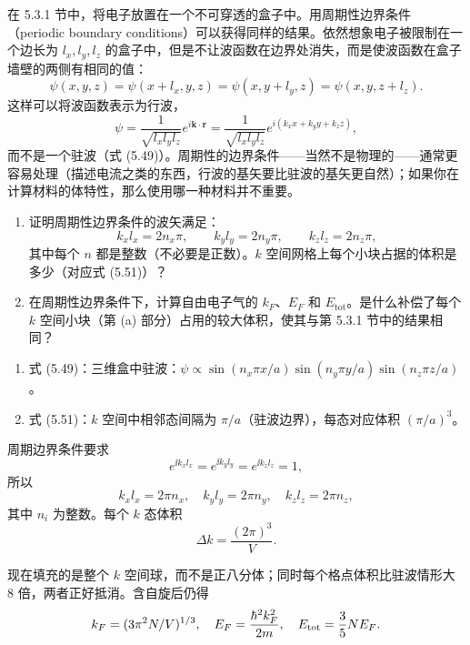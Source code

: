 \begin{question}
在 5.3.1 节中，将电子放置在一个不可穿透的盒子中。用周期性边界条件（periodic boundary conditions）可以获得同样的结果。依然想象电子被限制在一个边长为 $l_x,l_y,l_z$ 的盒子中，但是不让波函数在边界处消失，而是使波函数在盒子墙壁的两侧有相同的值：
\[
\psi(x,y,z)=\psi(x+l_x,y,z)=\psi(x,y+l_y,z)=\psi(x,y,z+l_z).
\]
这样可以将波函数表示为行波，
\[
\psi=\frac{1}{\sqrt{l_xl_yl_z}}e^{i\mathbf k\cdot\mathbf r}=\frac{1}{\sqrt{l_xl_yl_z}}e^{i(k_xx+k_yy+k_zz)},
\]
而不是一个驻波（式 (5.49)）。周期性的边界条件——当然不是物理的——通常更容易处理（描述电流之类的东西，行波的基矢要比驻波的基矢更自然）；如果你在计算材料的体特性，那么使用哪一种材料并不重要。
\begin{enumerate}
\item 证明周期性边界条件的波矢满足：
\[
k_xl_x=2n_x\pi,\qquad k_yl_y=2n_y\pi,\qquad k_zl_z=2n_z\pi,
\]
其中每个 $n$ 都是整数（不必要是正数）。$k$ 空间网格上每个小块占据的体积是多少（对应式 (5.51)）？
\item 在周期性边界条件下，计算自由电子气的 $k_F$、$E_F$ 和 $E_{\mathrm{tot}}$。是什么补偿了每个 $k$ 空间小块（第 (a) 部分）占用的较大体积，使其与第 5.3.1 节中的结果相同？
\end{enumerate}

\par\smallskip
{}
\begin{enumerate}[leftmargin=2.2em,itemsep=0.12em,topsep=0.12em,parsep=0pt]
\item 式 (5.49)：三维盒中驻波：$\psi\propto\sin(n_x\pi x/a)\sin(n_y\pi y/a)\sin(n_z\pi z/a)$。
\item 式 (5.51)：$k$ 空间中相邻态间隔为 $\pi/a$（驻波边界），每态对应体积 $(\pi/a)^3$。
\end{enumerate}

\end{question}
\begin{solution}

周期边界条件要求
\[
e^{\ii k_xl_x}=e^{\ii k_yl_y}=e^{\ii k_zl_z}=1,
\]
所以
\[
k_xl_x=2\pi n_x,
\quad k_yl_y=2\pi n_y,
\quad k_zl_z=2\pi n_z,
\]
其中 $n_i$ 为整数。每个 $k$ 态体积
\[
\Delta k=\frac{(2\pi)^3}{V}.
\]

现在填充的是整个 $k$ 空间球，而不是正八分体；同时每个格点体积比驻波情形大 $8$ 倍，两者正好抵消。含自旋后仍得
\[
k_F=(3\pi^2N/V)^{1/3},
\quad E_F=\frac{\hbar^2k_F^2}{2m},
\quad E_{\rm tot}=\frac35NE_F.
\]

\end{solution}

